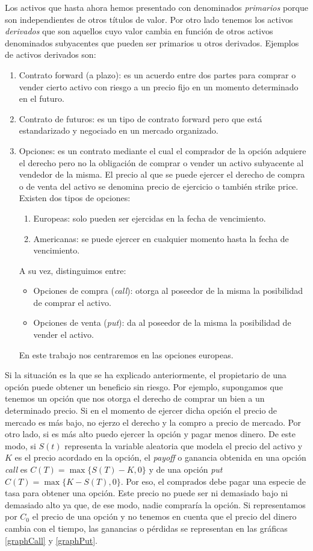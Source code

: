 Los activos que hasta ahora hemos presentado con denominados \textit{primarios} porque son independientes de otros títulos de valor. Por otro lado tenemos los activos \textit{derivados} que son aquellos cuyo valor cambia en función de otros activos denominados subyacentes que pueden ser primarios u otros derivados. Ejemplos de activos derivados son:
\begin{enumerate}
\item Contrato forward (a plazo): es un acuerdo entre dos partes para comprar o vender cierto activo con riesgo a un precio fijo en un momento determinado en el futuro. 
\item Contrato de futuros: es un tipo de contrato forward pero que está estandarizado y negociado en un mercado organizado.
\item Opciones: es un contrato mediante el cual el comprador de la opción adquiere el derecho pero no la obligación de comprar o vender un activo subyacente al vendedor de la misma. El precio al que se puede ejercer el derecho de compra o de venta del activo se denomina precio de ejercicio o también strike price. Existen dos tipos de opciones: 
\begin{enumerate}
	\item Europeas: solo pueden ser ejercidas en la fecha de vencimiento.
	\item Americanas:  se puede ejercer en cualquier momento hasta la fecha de vencimiento.
\end{enumerate}
A su vez, distinguimos entre:
\begin{itemize}
	\item Opciones de compra (\textit{call}): otorga al poseedor de la misma la posibilidad de comprar el activo.
	\item Opciones de venta (\textit{put}): da al poseedor de la misma la posibilidad de vender el activo.
\end{itemize}

En este trabajo nos centraremos en las opciones europeas. 
\end{enumerate} 

Si la situación es la que se ha explicado anteriormente, el propietario de una opción puede obtener un beneficio sin riesgo. Por ejemplo, supongamos que tenemos un opción que nos otorga el derecho de comprar un bien a un determinado precio. Si en el momento de ejercer dicha opción el precio de mercado es más bajo, no ejerzo el derecho y la compro a precio de mercado. Por otro lado, si es más alto puedo ejercer la opción y pagar menos dinero. De este modo, si $ S(t) $ representa la variable aleatoria que modela el precio del activo y $ K $ es el precio acordado en la opción, el \textit{payoff} o ganancia obtenida en una opción \textit{call} es $ C(T) = \max\{S(T)-K, 0\} $ y de una opción \textit{put} $ C(T) = \max\{K-S(T), 0\}  $. Por eso, el comprados debe pagar una especie de tasa para obtener una opción. Este precio no puede ser ni demasiado bajo ni demasiado alto ya que, de ese modo, nadie compraría la opción. Si representamos por $ C_0 $ el precio de una opción y no tenemos en cuenta que el precio del dinero cambia con el tiempo, las ganancias o pérdidas se representan en las gráficas \ref{graphCall} y \ref{graphPut}. \\

